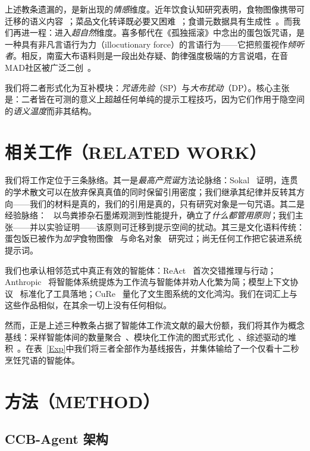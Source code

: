 \documentclass[journal]{IEEEtran}
\begin{document}
上述教条遗漏的，是新出现的\emph{情感}维度。近年饮食认知研究表明，食物图像携带可迁移的语义内容~\cite{takagi2025}；菜品文化转译既必要又困难~\cite{khanuja2024}；食谱元数据具有生成性~\cite{watanabe2025}。而我们再进一程：进入\emph{超自然}维度。喜多郁代在《孤独摇滚》中念出的蛋包饭咒语，是一种具有非凡言语行为力（illocutionary force）的言语行为——它把煎蛋视作\emph{倾听者}。相反，南蛮大布语料则是一段出处存疑、韵律强度极端的方言说唱，在音MAD社区被广泛二创~\cite{otomadwiki,moegirl2026}。

我们将二者形式化为互补模块：\emph{咒语先验}（SP）与\emph{大布扰动}（DP）。核心主张是：二者皆在可测的意义上超越任何单纯的提示工程技巧，因为它们作用于隐空间的\emph{语义温度}而非其结构。

\section{相关工作（RELATED WORK）}

我们将工作定位于三条脉络。其一是\emph{最高产荒诞}方法论脉络：Sokal~\cite{sokal1996} 证明，连贯的学术散文可以在放弃保真真值的同时保留引用密度；我们继承其纪律并反转其方向——我们的材料是真的，我们的引用是真的，只有研究对象是一句咒语。其二是经验脉络：~\cite{pumera2020} 以鸟粪掺杂石墨烯观测到性能提升，确立了\emph{什么都管用原则}；我们主张——并以实验证明——该原则可迁移到提示空间的扰动。其三是文化语料传统：蛋包饭已被作为\emph{加字}食物图像~\cite{takagi2025} 与命名对象~\cite{watanabe2025} 研究过；尚无任何工作把它装进系统提示词。

我们也承认相邻范式中真正有效的智能体：ReAct~\cite{react2022} 首次交错推理与行动；Anthropic~\cite{anthropic2024} 将智能体系统提炼为工作流与智能体并劝人化繁为简；模型上下文协议~\cite{mcp2024} 标准化了工具落地；CuRe~\cite{cure2025} 量化了文生图系统的文化鸿沟。我们在词汇上与这些作品相似，在其余一切上没有任何相似。

然而，正是上述三种教条占据了智能体工作流文献的最大份额，我们将其作为概念基线：采样智能体间的数量聚合~\cite{moreagents2024}、模块化工作流的图式形式化~\cite{flow2025}、综述驱动的堆积~\cite{gensurvey2026}。在表~\ref{Exp}中我们将三者全部作为基线报告，并集体输给了一个仅看十二秒烹饪咒语的智能体。

\section{方法（METHOD）}

\subsection{CCB-Agent 架构}
\end{document}
